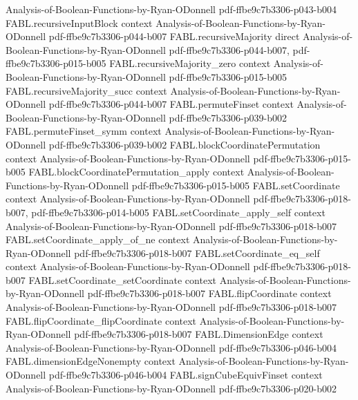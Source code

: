 \begin{theorem}
  {Analysis-of-Boolean-Functions-by-Ryan-ODonnell}
  {pdf-ffbe9c7b3306-p043-b004}
\proofstep
  {FABL.recursiveInputBlock}
  {context}
  {Analysis-of-Boolean-Functions-by-Ryan-ODonnell}
  {pdf-ffbe9c7b3306-p044-b007}
\proofstep
  {FABL.recursiveMajority}
  {direct}
  {Analysis-of-Boolean-Functions-by-Ryan-ODonnell}
  {pdf-ffbe9c7b3306-p044-b007,
    pdf-ffbe9c7b3306-p015-b005}
\proofstep
  {FABL.recursiveMajority_zero}
  {context}
  {Analysis-of-Boolean-Functions-by-Ryan-ODonnell}
  {pdf-ffbe9c7b3306-p015-b005}
\proofstep
  {FABL.recursiveMajority_succ}
  {context}
  {Analysis-of-Boolean-Functions-by-Ryan-ODonnell}
  {pdf-ffbe9c7b3306-p044-b007}
\proofstep
  {FABL.permuteFinset}
  {context}
  {Analysis-of-Boolean-Functions-by-Ryan-ODonnell}
  {pdf-ffbe9c7b3306-p039-b002}
\proofstep
  {FABL.permuteFinset_symm}
  {context}
  {Analysis-of-Boolean-Functions-by-Ryan-ODonnell}
  {pdf-ffbe9c7b3306-p039-b002}
\proofstep
  {FABL.blockCoordinatePermutation}
  {context}
  {Analysis-of-Boolean-Functions-by-Ryan-ODonnell}
  {pdf-ffbe9c7b3306-p015-b005}
\proofstep
  {FABL.blockCoordinatePermutation_apply}
  {context}
  {Analysis-of-Boolean-Functions-by-Ryan-ODonnell}
  {pdf-ffbe9c7b3306-p015-b005}
\proofstep
  {FABL.setCoordinate}
  {context}
  {Analysis-of-Boolean-Functions-by-Ryan-ODonnell}
  {pdf-ffbe9c7b3306-p018-b007,
    pdf-ffbe9c7b3306-p014-b005}
\proofstep
  {FABL.setCoordinate_apply_self}
  {context}
  {Analysis-of-Boolean-Functions-by-Ryan-ODonnell}
  {pdf-ffbe9c7b3306-p018-b007}
\proofstep
  {FABL.setCoordinate_apply_of_ne}
  {context}
  {Analysis-of-Boolean-Functions-by-Ryan-ODonnell}
  {pdf-ffbe9c7b3306-p018-b007}
\proofstep
  {FABL.setCoordinate_eq_self}
  {context}
  {Analysis-of-Boolean-Functions-by-Ryan-ODonnell}
  {pdf-ffbe9c7b3306-p018-b007}
\proofstep
  {FABL.setCoordinate_setCoordinate}
  {context}
  {Analysis-of-Boolean-Functions-by-Ryan-ODonnell}
  {pdf-ffbe9c7b3306-p018-b007}
\proofstep
  {FABL.flipCoordinate}
  {context}
  {Analysis-of-Boolean-Functions-by-Ryan-ODonnell}
  {pdf-ffbe9c7b3306-p018-b007}
\proofstep
  {FABL.flipCoordinate_flipCoordinate}
  {context}
  {Analysis-of-Boolean-Functions-by-Ryan-ODonnell}
  {pdf-ffbe9c7b3306-p018-b007}
\proofstep
  {FABL.DimensionEdge}
  {context}
  {Analysis-of-Boolean-Functions-by-Ryan-ODonnell}
  {pdf-ffbe9c7b3306-p046-b004}
\proofstep
  {FABL.dimensionEdgeNonempty}
  {context}
  {Analysis-of-Boolean-Functions-by-Ryan-ODonnell}
  {pdf-ffbe9c7b3306-p046-b004}
\proofstep
  {FABL.signCubeEquivFinset}
  {context}
  {Analysis-of-Boolean-Functions-by-Ryan-ODonnell}
  {pdf-ffbe9c7b3306-p020-b002}
\proofstep

\end{theorem}

